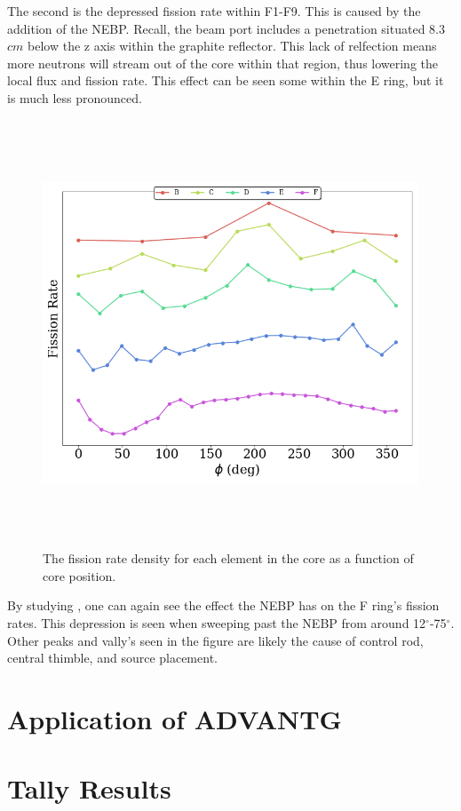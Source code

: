 The second is the depressed fission rate within F1-F9.
This is caused by the addition of the NEBP.
Recall, the beam port includes a penetration situated 8.3 $cm$ below the z axis within the graphite reflector.
This lack of relfection means more neutrons will stream out of the core within that region, thus lowering the local flux and fission rate.
This effect can be seen some within the E ring, but it is much less pronounced.


\begin{figure}[htb]
\centering
\includegraphics[height=5in]{tex/figures/totals_azi.png}
\caption[Whole Core Azimuthal Fission Rate Density]{The fission rate density for each element in the core as a function of core position.}
\label{fig:totals_azi}
\end{figure}

By studying , one can again see the effect the NEBP has on the F ring's fission rates.
This depression is seen when sweeping past the NEBP from around 12$^{\circ}$-75$^{\circ}$.
Other peaks and vally's seen in the figure are likely the cause of control rod, central thimble, and source placement.

\clearpage

\section{Application of ADVANTG}

\section{Tally Results}
